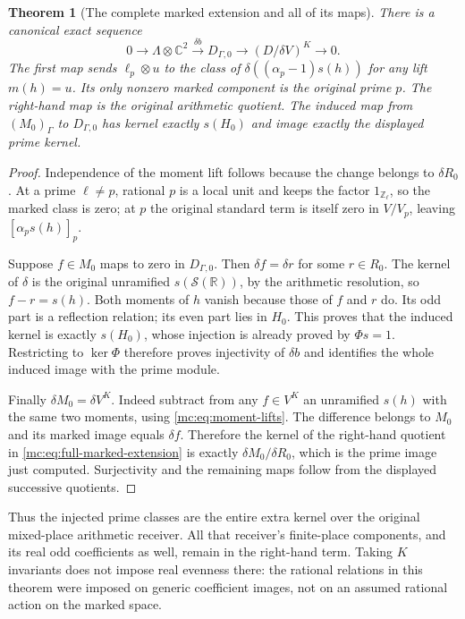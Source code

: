 \documentclass[11pt,a4paper]{article}
\newtheorem{theorem}{Theorem}[section]
\theoremstyle{definition}\newtheorem{definition}[theorem]{Definition}
\newcommand{\Z}{\mathbb Z}\newcommand{\Q}{\mathbb Q}
\newcommand{\C}{\mathbb C}\newcommand{\R}{\mathbb R}
\begin{document}
\begin{theorem}[The complete marked extension and all of its maps]
\label{mc:thm:marked-extension}
There is a canonical exact sequence
\[
 0\longrightarrow\Lambda\otimes\C^2
 \xrightarrow{\delta b}D_{\Gamma,0}
 \longrightarrow (D/\delta V)^K\longrightarrow0.
 \tag{MC21}\label{mc:eq:full-marked-extension}
\]
The first map sends $\ell_p\otimes u$ to the class of
$\delta((\alpha_p-1)s(h))$ for any lift $m(h)=u$. Its only
nonzero marked component is the original prime $p$. The right-hand
map is the original arithmetic quotient. The induced map from
$(M_0)_\Gamma$ to $D_{\Gamma,0}$ has kernel exactly $s(H_0)$
and image exactly the displayed prime kernel.
\end{theorem}
\begin{proof}
Independence of the moment lift follows because the change belongs
to $\delta R_0$. At a prime $\ell\ne p$, rational $p$ is a
local unit and keeps the factor $1_{\Z_\ell}$, so the marked
class is zero; at $p$ the original standard term is itself zero
in $V/V_p$, leaving $[\alpha_ps(h)]_p$.

Suppose $f\in M_0$ maps to zero in $D_{\Gamma,0}$. Then
$\delta f=\delta r$ for some $r\in R_0$. The kernel of
$\delta$ is the original unramified $s(\mathcal S(\mathbb R))$,
by the arithmetic resolution, so $f-r=s(h)$. Both moments of
$h$ vanish because those of $f$ and $r$ do. Its odd part is a
reflection relation; its even part lies in $H_0$. This proves
that the induced kernel is exactly $s(H_0)$, whose injection
is already proved by $\Phi s=1$. Restricting to $\ker\Phi$
therefore proves injectivity of $\delta b$ and identifies the
whole induced image with the prime module.

Finally $\delta M_0=\delta V^K$. Indeed subtract from any
$f\in V^K$ an unramified $s(h)$ with the same two moments,
using \eqref{mc:eq:moment-lifts}. The difference belongs to $M_0$
and its marked image equals $\delta f$. Therefore the kernel
of the right-hand quotient in \eqref{mc:eq:full-marked-extension}
is exactly $\delta M_0/\delta R_0$, which is the prime image
just computed. Surjectivity and the remaining maps follow from
the displayed successive quotients.
\end{proof}

Thus the injected prime classes are the entire extra kernel over
the original mixed-place arithmetic receiver. All that receiver's
finite-place components, and its real odd coefficients as well,
remain in the right-hand term. Taking $K$ invariants does not
impose real evenness there: the rational relations in this theorem
were imposed on generic coefficient images, not on an assumed
rational action on the marked space.
\end{document}
